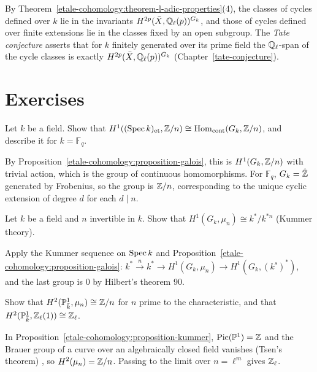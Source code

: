 \begin{remark}\label{etale-cohomology:remark-tate}
By Theorem~\ref{etale-cohomology:theorem-l-adic-properties}(4), the classes of cycles defined over $k$ lie in the invariants $H^{2p}(\bar X, \mathbb{Q}_\ell(p))^{G_k}$, and those of cycles defined over finite
extensions lie in the classes fixed by an open subgroup. The \emph{Tate conjecture} asserts that for $k$ finitely generated over its prime field the $\mathbb{Q}_\ell$-span of the cycle classes is exactly
$H^{2p}(\bar X, \mathbb{Q}_\ell(p))^{G_k}$ (Chapter~\ref{tate-conjecture}).
\end{remark}

\section{Exercises}\label{etale-cohomology:section-exercises}

\begin{exercise}\label{etale-cohomology:exercise-h1-z-mod-n}
Let $k$ be a field. Show that $H^1((\operatorname{Spec} k)_{\mathrm{et}}, \mathbb{Z}/n) \cong \operatorname{Hom}_{\mathrm{cont}}(G_k, \mathbb{Z}/n)$, and describe it for $k = \mathbb{F}_q$.
\end{exercise}

\begin{solution}
By Proposition~\ref{etale-cohomology:proposition-galois}, this is $H^1(G_k, \mathbb{Z}/n)$ with trivial action, which is the group of continuous homomorphisms. For $\mathbb{F}_q$, $G_k = \hat{\mathbb{Z}}$
generated by Frobenius, so the group is $\mathbb{Z}/n$, corresponding to the unique cyclic extension of degree $d$ for each $d \mid n$.
\end{solution}

\begin{exercise}\label{etale-cohomology:exercise-kummer-field}
Let $k$ be a field and $n$ invertible in $k$. Show that $H^1(G_k, \mu_n) \cong k^*/k^{*n}$ (Kummer theory).
\end{exercise}

\begin{solution}
Apply the Kummer sequence on $\operatorname{Spec} k$ and Proposition~\ref{etale-cohomology:proposition-galois}: $k^* \xrightarrow{n} k^* \to H^1(G_k, \mu_n) \to H^1(G_k, (k^s)^*)$, and the last group is $0$ by Hilbert's
theorem 90.
\end{solution}

\begin{exercise}\label{etale-cohomology:exercise-projective-line}
Show that $H^2(\mathbb{P}^1_{\bar k}, \mu_n) \cong \mathbb{Z}/n$ for $n$ prime to the characteristic, and that $H^2(\mathbb{P}^1_{\bar k}, \mathbb{Z}_\ell(1)) \cong \mathbb{Z}_\ell$.
\end{exercise}

\begin{solution}
In Proposition~\ref{etale-cohomology:proposition-kummer}, $\operatorname{Pic}(\mathbb{P}^1) = \mathbb{Z}$ and the Brauer group of a curve over an algebraically closed field vanishes (Tsen's theorem)
\cite[Chapter III]{milne-etale}, so $H^2(\mu_n) = \mathbb{Z}/n$. Passing to the limit over $n = \ell^m$ gives $\mathbb{Z}_\ell$.
\end{solution}
